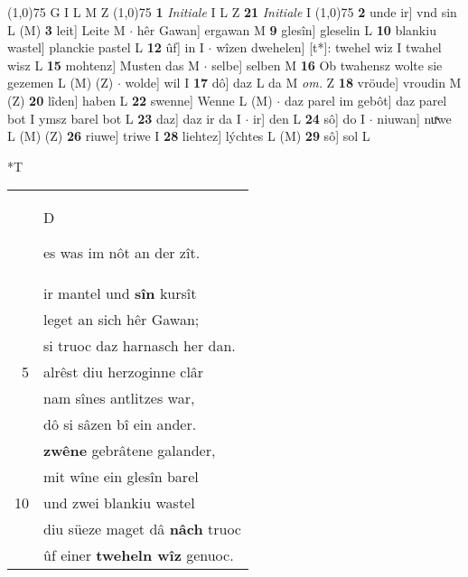 \documentclass[8pt,a4paper,notitlepage]{article}
\begin{document}
\begin{table}[ht]
\begin{minipage}[t]{0.5\linewidth}
\begin{tabular}{rl}
\end{tabular}
\scriptsize
\line(1,0){75} \newline
G I L M Z \newline
\line(1,0){75} \newline
\textbf{1} \textit{Initiale} I L Z  \textbf{21} \textit{Initiale} I  \newline
\line(1,0){75} \newline
\textbf{2} unde ir] vnd sin L (M) \textbf{3} leit] Leite M  $\cdot$ hêr Gawan] ergawan M \textbf{9} glesîn] gleselin L \textbf{10} blankiu wastel] planckie pastel L \textbf{12} ûf] in I  $\cdot$ wîzen dwehelen] [t*]: twehel wiz I twahel wisz L \textbf{15} mohtenz] Musten das M  $\cdot$ selbe] selben M \textbf{16} Ob twahensz wolte sie gezemen L (M) (Z)  $\cdot$ wolde] wil I \textbf{17} dô] daz L da M \textit{om.} Z \textbf{18} vröude] vroudin M (Z) \textbf{20} lîden] haben L \textbf{22} swenne] Wenne L (M)  $\cdot$ daz parel im gebôt] daz parel bot I ymsz barel bot L \textbf{23} daz] daz ir da I  $\cdot$ ir] den L \textbf{24} sô] do I  $\cdot$ niuwan] nuͯwe L (M) (Z) \textbf{26} riuwe] triwe I \textbf{28} liehtez] lýchtes L (M) \textbf{29} sô] sol L \newline
\end{minipage}
\hspace{0.5cm}
\begin{minipage}[t]{0.5\linewidth}
\small
\begin{center}*T
\end{center}
\begin{tabular}{rl}
 & \begin{large}D\end{large}es was im nôt an der zît.\\ 
 & ir mantel und \textbf{sîn} kursît\\ 
 & leget an sich hêr Gawan;\\ 
 & si truoc daz harnasch her dan.\\ 
5 & alrêst diu herzoginne clâr\\ 
 & nam sînes antlitzes war,\\ 
 & dô si sâzen bî ein ander.\\ 
 & \textbf{zwêne} gebrâtene galander,\\ 
 & mit wîne ein glesîn barel\\ 
10 & und zwei blankiu wastel\\ 
 & diu süeze maget dâ \textbf{nâch} truoc\\ 
 & ûf einer \textbf{tweheln wîz} genuoc.\\ 

\end{tabular}
\end{minipage}
\end{table}
\end{document}
